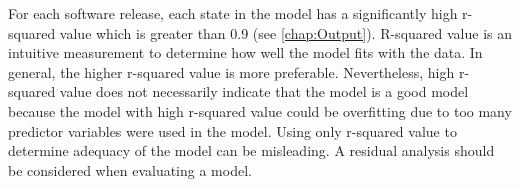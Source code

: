 For each software release, each state in the model has a significantly
high r-squared value which is greater than 0.9 (see \ref{chap:Output}).
R-squared value is an intuitive measurement to determine how well
the model fits with the data. In general, the higher r-squared value
is more preferable. Nevertheless, high r-squared value does not necessarily
indicate that the model is a good model because the model with high
r-squared value could be overfitting due to too many predictor variables
were used in the model. Using only r-squared value to determine adequacy
of the model can be misleading. A residual analysis should be considered
when evaluating a model. %
\begin{comment}
R-squared cannot determine whether the coefficient estimates and predictions
are biased, which is why you must assess the residual plots.

R-squared value cannot be solely used to indicate whether the model
is adequate or not. In order to assess this, a residual analysis is
required. 

There are many factors that affect value of r-squared. One factor
is the number of predictor variables in the model. R-squared value
increases when there are more terms in the model. Another reason,
which is somehow a consequence of adding too many predictor variables,
is that the model might be overfitting the data. As a result, the
model produces misleading high r-squared.
\end{comment}


